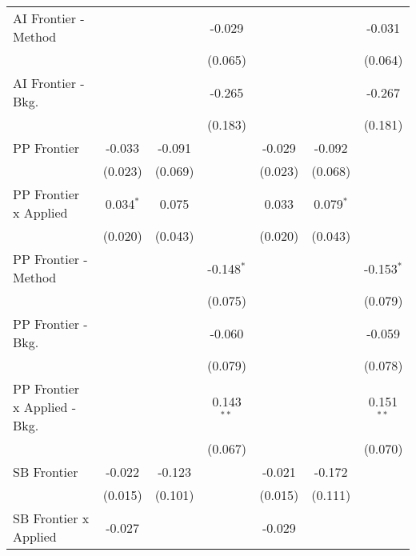 \begin{tabular}{lcccccc}
   AI Frontier - Method         &               &         & -0.029       &               &             & -0.031\\   
                                &               &         & (0.065)      &               &             & (0.064)\\   
   AI Frontier - Bkg.           &               &         & -0.265       &               &             & -0.267\\   
                                &               &         & (0.183)      &               &             & (0.181)\\   
   PP Frontier                  & -0.033        & -0.091  &              & -0.029        & -0.092      &   \\   
                                & (0.023)       & (0.069) &              & (0.023)       & (0.068)     &   \\   
   PP Frontier x Applied        & 0.034$^{*}$   & 0.075   &              & 0.033         & 0.079$^{*}$ &   \\   
                                & (0.020)       & (0.043) &              & (0.020)       & (0.043)     &   \\   
   PP Frontier - Method         &               &         & -0.148$^{*}$ &               &             & -0.153$^{*}$\\   
                                &               &         & (0.075)      &               &             & (0.079)\\   
   PP Frontier - Bkg.           &               &         & -0.060       &               &             & -0.059\\   
                                &               &         & (0.079)      &               &             & (0.078)\\   
   PP Frontier x Applied - Bkg. &               &         & 0.143$^{**}$ &               &             & 0.151$^{**}$\\   
                                &               &         & (0.067)      &               &             & (0.070)\\   
   SB Frontier                  & -0.022        & -0.123  &              & -0.021        & -0.172      &   \\   
                                & (0.015)       & (0.101) &              & (0.015)       & (0.111)     &   \\   
   SB Frontier x Applied        & -0.027        &         &              & -0.029        &             &   \\   

\end{tabular}
